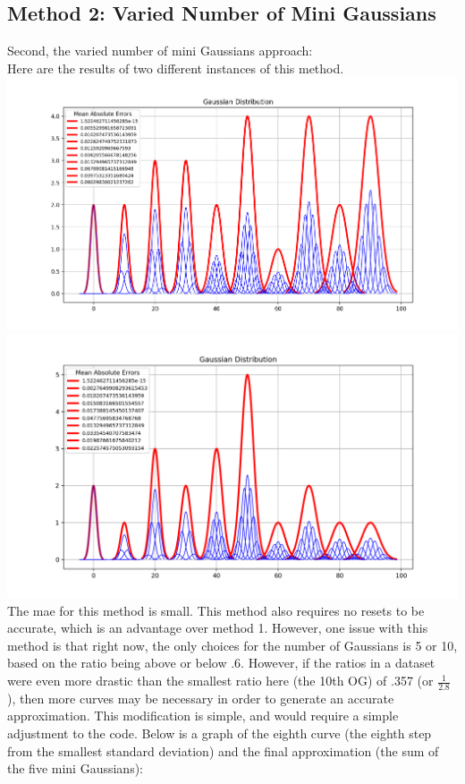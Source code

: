 \documentclass{article}
\begin{document}
\subsection*{Method 2: Varied Number of Mini Gaussians} 
Second, the varied number of mini Gaussians approach: \\
Here are the results of two different instances of this method. \\
\includegraphics[scale = .6,trim= 2in 0.1in 2in 0in]{varied.png} \\
\includegraphics[scale = .6,trim= 1.5in 0.1in 2in 0in]{varied2.png} \\
The mae for this method is small. This method also requires no resets to be accurate, which is an advantage over method 1. However, one issue with this method is that right now, the only choices for the number of Gaussians is 5 or 10, based on the ratio being above or below .6. However, if the ratios in a dataset were even more drastic than the smallest ratio here (the 10th OG) of .357 (or $\frac{1}{2.8}$), then more curves may be necessary in order to generate an accurate approximation. This modification is simple, and would require a simple adjustment to the code. Below is a graph of the eighth curve (the eighth step from the smallest standard deviation) and the final approximation (the sum of the five mini Gaussians): \\
\end{document}

